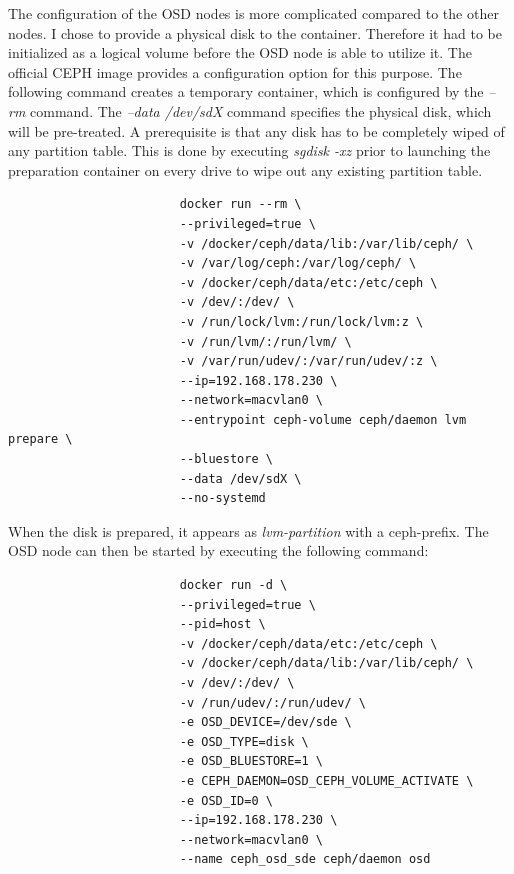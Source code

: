 \documentclass[titlepage, a4paper, 11pt]{scrartcl}
\begin{document}
                    The configuration of the OSD nodes is more complicated compared to the other nodes. I chose to provide a physical disk
                    to the container. Therefore it had to be initialized as a logical volume before the OSD node is able to utilize it.
                    The official CEPH image provides a configuration option for this purpose. The following command creates a temporary container,
                    which is configured by the \textit{--rm} command. The \textit{--data /dev/sdX} command specifies the physical disk, which will be 
                    pre-treated. A prerequisite is that any disk has to be completely wiped of any partition table. This is done by executing \textit{sgdisk -xz}
                    prior to launching the preparation container on every drive to wipe out any existing partition table.

                    \begin{lstlisting}
                        docker run --rm \
                        --privileged=true \
                        -v /docker/ceph/data/lib:/var/lib/ceph/ \
                        -v /var/log/ceph:/var/log/ceph/ \
                        -v /docker/ceph/data/etc:/etc/ceph \
                        -v /dev/:/dev/ \
                        -v /run/lock/lvm:/run/lock/lvm:z \
                        -v /run/lvm/:/run/lvm/ \
                        -v /var/run/udev/:/var/run/udev/:z \
                        --ip=192.168.178.230 \
                        --network=macvlan0 \
                        --entrypoint ceph-volume ceph/daemon lvm prepare \
                        --bluestore \
                        --data /dev/sdX \
                        --no-systemd                            
                    \end{lstlisting} 

                    When the disk is prepared, it appears as \textit{lvm-partition} with a ceph-prefix. The OSD node can then be started by executing the following command:

                    \begin{lstlisting}
                        docker run -d \
                        --privileged=true \
                        --pid=host \
                        -v /docker/ceph/data/etc:/etc/ceph \
                        -v /docker/ceph/data/lib:/var/lib/ceph/ \
                        -v /dev/:/dev/ \
                        -v /run/udev/:/run/udev/ \
                        -e OSD_DEVICE=/dev/sde \
                        -e OSD_TYPE=disk \
                        -e OSD_BLUESTORE=1 \
                        -e CEPH_DAEMON=OSD_CEPH_VOLUME_ACTIVATE \
                        -e OSD_ID=0 \
                        --ip=192.168.178.230 \
                        --network=macvlan0 \
                        --name ceph_osd_sde ceph/daemon osd
                    \end{lstlisting}
\end{document}

